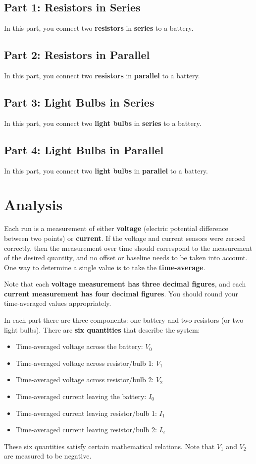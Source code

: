 \subsection{Part 1: Resistors in Series}
%
In this part, you connect two \textbf{resistors} in \textbf{series} to a battery.
%
\subsection{Part 2: Resistors in Parallel}
%
In this part, you connect two \textbf{resistors} in \textbf{parallel} to a battery.
%
\subsection{Part 3: Light Bulbs in Series}
%
In this part, you connect two \textbf{light bulbs} in \textbf{series} to a battery.
%
\subsection{Part 4: Light Bulbs in Parallel}
%
In this part, you connect two \textbf{light bulbs} in \textbf{parallel} to a battery.
%
\section{Analysis}
%
Each run is a measurement of either \textbf{voltage} (electric potential difference between two points) or \textbf{current}. If the voltage and current sensors were zeroed correctly, then the measurement over time should correspond to the measurement of the desired quantity, and no offset or baseline needs to be taken into account. One way to determine a single value is to take the \textbf{time-average}.

Note that each \textbf{voltage measurement has three decimal figures}, and each \textbf{current measurement has four decimal figures}. You should round your time-averaged values appropriately.

In each part there are three components: one battery and two resistors (or two light bulbs). There are \textbf{six quantities} that describe the system:
\begin{itemize}
	\item Time-averaged voltage across the battery: $V_{0}$
	\item Time-averaged voltage across resistor/bulb 1: $V_{1}$
	\item Time-averaged voltage across resistor/bulb 2: $V_{2}$
	\item Time-averaged current leaving the battery: $I_{0}$
	\item Time-averaged current leaving resistor/bulb 1: $I_{1}$
	\item Time-averaged current leaving resistor/bulb 2: $I_{2}$
\end{itemize}
These six quantities satisfy certain mathematical relations. Note that $V_{1}$ and $V_{2}$ are measured to be negative.
%
